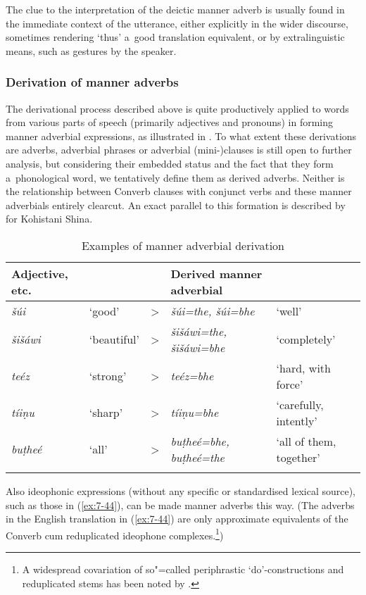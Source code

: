 The clue to the interpretation of the deictic manner adverb is usually found in the immediate context of the utterance, either explicitly in the wider discourse, sometimes rendering `thus' a~good translation equivalent, or by extralinguistic means, such as gestures by the speaker. 


\subsubsection*{Derivation of manner adverbs}

The derivational process described above is quite productively applied to words from various parts
of speech (primarily adjectives and pronouns) in forming manner adverbial expressions, as
illustrated in . To what extent these derivations are adverbs, adverbial phrases or
adverbial (mini-)clauses is still open to further analysis, but considering their embedded status
and the fact that they form a~phonological word, we tentatively define them as derived
adverbs. Neither is the relationship between Converb clauses with conjunct verbs and these manner
adverbials entirely clearcut. An exact parallel to this formation is described by
\citet[219]{schmidtkohistani2008} for Kohistani Shina.


\begin{table}[ht]
\caption{Examples of manner adverbial derivation}

\begin{tabularx}{\textwidth}{ P{17mm} l l Q Q }
\lsptoprule
Adjective, etc. &
&
&
Derived manner adverbial &
\\\hline
\textit{šúi} &
`good' &
{\textgreater} &
\textit{šúi=the, šúi=bhe} &
`well'\\
\textit{šišáwi} &
`beautiful' &
{\textgreater} &
\textit{šišáwi=the, šišáwi=bhe} &
`completely'\\
\textit{teéz} &
`strong' &
{\textgreater} &
\textit{teéz=bhe} &
`hard, with force'\\
\textit{tíiṇu} &
`sharp' &
{\textgreater} &
\textit{tíiṇu=bhe} &
`carefully, intently'\\
\textit{buṭheé} &
`all' &
{\textgreater} &
\textit{buṭheé=bhe, buṭheé=the} &
`all of them, together'\\\lspbottomrule
\end{tabularx}
\label{tab:7-3}
\end{table}


Also ideophonic expressions (without any specific or standardised lexical source), such as those in (\ref{ex:7-44}), can be made manner adverbs this way. (The adverbs in the English translation in (\ref{ex:7-44}) are only approximate equivalents of the Converb cum reduplicated ideophone complexes.\footnote{A widespread covariation of so"=called periphrastic `do'-constructions and reduplicated stems has been noted by \citet{jaeger2006}.})

